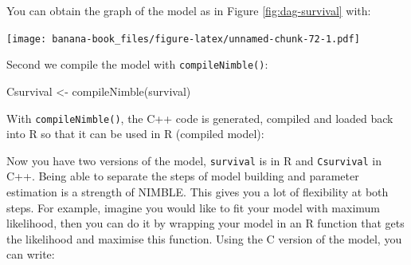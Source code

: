 \documentclass[
  12pt,
]{krantz}
\newenvironment{Shaded}{\begin{snugshade}}{\end{snugshade}}
\newcommand{\DocumentationTok}[1]{\textcolor[rgb]{0.56,0.35,0.01}{\textbf{\textit{#1}}}}
\newcommand{\FunctionTok}[1]{\textcolor[rgb]{0.00,0.00,0.00}{#1}}
\newcommand{\NormalTok}[1]{#1}
\newcommand{\OtherTok}[1]{\textcolor[rgb]{0.56,0.35,0.01}{#1}}
\newcommand{\SpecialCharTok}[1]{\textcolor[rgb]{0.00,0.00,0.00}{#1}}
\begin{document}
You can obtain the graph of the model as in Figure \ref{fig:dag-survival} with:

\begin{Shaded}
\end{Shaded}

\texttt{[image: banana-book\_files/figure-latex/unnamed-chunk-72-1.pdf]}

Second we compile the model with \texttt{compileNimble()}:

\begin{Shaded}
\begin{Highlighting}[]
\NormalTok{Csurvival }\OtherTok{\textless{}{-}} \FunctionTok{compileNimble}\NormalTok{(survival)}
\end{Highlighting}
\end{Shaded}

With \texttt{compileNimble()}, the C++ code is generated, compiled and loaded back into R so that it can be used in R (compiled model):

\begin{Shaded}
\end{Shaded}

Now you have two versions of the model, \texttt{survival} is in R and \texttt{Csurvival} in C++. Being able to separate the steps of model building and parameter estimation is a strength of NIMBLE. This gives you a lot of flexibility at both steps. For example, imagine you would like to fit your model with maximum likelihood, then you can do it by wrapping your model in an R function that gets the likelihood and maximise this function. Using the C version of the model, you can write:
\end{document}

